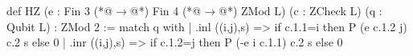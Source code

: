 def HZ (e : Fin 3 (*@$\to$@*) Fin 4 (*@$\to$@*) ZMod L) (c : ZCheck L) (q : Qubit L) : ZMod 2 := match q with
  | .inl ((i,j),s) => if c.1.1=i then P (e c.1.2 j) c.2 s else 0
  | .inr ((i,j),s) => if c.1.2=j then P (-e i c.1.1) c.2 s else 0
